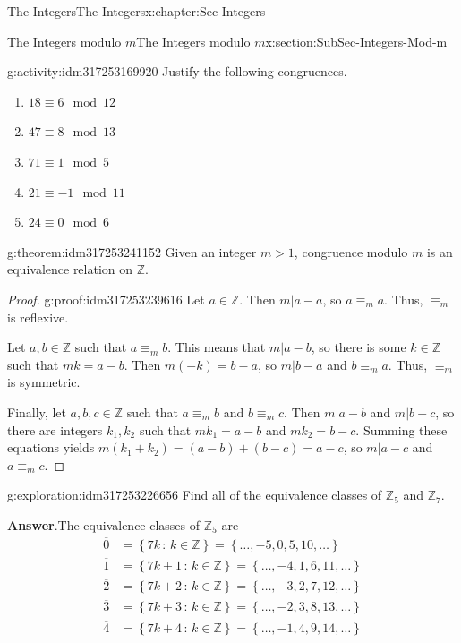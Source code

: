 \documentclass[oneside,10pt,]{book}
\newcommand{\blocktitlefont}{\relax}
\numberwithin{equation}{section}
\newcommand{\set}[1]{\left\{ {#1} \right\}}
\newcommand{\setof}[2]{{\left\{#1\,\colon\,#2\right\}}}
\def\Z{{\mathbb Z}}
\newcommand{\amp}{&}
\begin{document}
\begin{chapterptx}{The Integers}{}{The Integers}{}{}{x:chapter:Sec-Integers}
\begin{sectionptx}{The Integers modulo \(m\)}{}{The Integers modulo \(m\)}{}{}{x:section:SubSec-Integers-Mod-m}
\begin{activity}{}{g:activity:idm317253169920}
Justify the following congruences.%
\begin{enumerate}
\item{}\(\displaystyle 18 \equiv 6\mod 12\)%
\item{}\(\displaystyle 47 \equiv 8\mod 13\)%
\item{}\(\displaystyle 71 \equiv 1\mod 5\)%
\item{}\(\displaystyle 21 \equiv -1 \mod 11\)%
\item{}\(\displaystyle 24 \equiv 0\mod 6\)%
\end{enumerate}
%
\end{activity}
\begin{theorem}{}{}{g:theorem:idm317253241152}%
Given an integer \(m > 1\), congruence modulo \(m\) is an equivalence relation on \(\Z\).%
\end{theorem}
\begin{proof}{}{g:proof:idm317253239616}
Let \(a\in \Z\). Then \(m|a-a\), so \(a \equiv_m a\). Thus, \(\equiv_m\) is reflexive.%
\par
Let \(a,b\in \Z\) such that \(a\equiv_m b\). This means that \(m|a-b\), so there is some \(k\in \Z\) such that \(mk = a-b\). Then \(m(-k) = b-a\), so \(m|b-a\) and \(b \equiv_m a\). Thus, \(\equiv_m\) is symmetric.%
\par
Finally, let \(a,b,c\in \Z\) such that \(a\equiv_m b\) and \(b\equiv_m c\). Then \(m|a-b\) and \(m|b-c\), so there are integers \(k_1, k_2\) such that \(m k_1 = a-b\) and \(m k_2 = b-c\). Summing these equations yields \(m(k_1 + k_2) = (a-b) + (b-c) = a-c\), so \(m|a-c\) and \(a\equiv_m c\).%
\end{proof}
\label{g:notation:idm317253233568}%
\begin{exploration}{}{g:exploration:idm317253226656}%
Find all of the equivalence classes of \(\Z_5\) and \(\Z_7\).%
\par\smallskip%
\noindent\textbf{\blocktitlefont Answer}.\hypertarget{g:answer:idm317253225264}{}\quad{}The equivalence classes of \(\Z_5\) are%
\begin{align*}
\overline{0} \amp = \setof{7k}{k\in\Z} = \set{\ldots, -5, 0, 5, 10, \ldots}\\
\overline{1} \amp = \setof{7k+1}{k\in\Z} = \set{\ldots, -4, 1, 6, 11, \ldots}\\
\overline{2} \amp = \setof{7k+2}{k\in\Z} = \set{\ldots, -3, 2, 7, 12, \ldots}\\
\overline{3} \amp = \setof{7k+3}{k\in\Z} = \set{\ldots, -2, 3, 8, 13, \ldots}\\
\overline{4} \amp = \setof{7k+4}{k\in\Z} = \set{\ldots, -1, 4, 9, 14, \ldots}

\end{align*}
\end{exploration}
\end{sectionptx}
\end{chapterptx}
\end{document}

